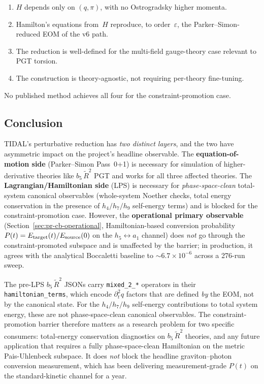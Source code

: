 \begin{enumerate}
  \item[(i)] $H$ depends only on $(q, \pi)$, with no Ostrogradsky higher
        momenta.
  \item[(ii)] Hamilton's equations from~$H$ reproduce, to order~$\varepsilon$,
        the Parker--Simon-reduced EOM of the v6 path.
  \item[(iii)] The reduction is well-defined for the multi-field
        gauge-theory case relevant to PGT torsion.
  \item[(iv)] The construction is theory-agnostic, not requiring per-theory
        fine-tuning.
\end{enumerate}

No published method achieves all four for the constraint-promotion case.

\subsection{Conclusion}
\label{sec:pr-cb-conclusion}

TIDAL's perturbative reduction has \emph{two distinct layers}, and the
two have asymmetric impact on the project's headline observable.  The
\textbf{equation-of-motion side} (Parker--Simon Pass~0+1) is necessary
for simulation of higher-derivative theories like $b_5\,\tilde{R}^2$ PGT
and works for all three affected theories.  The
\textbf{Lagrangian/Hamiltonian side} (LPS) is necessary for
\emph{phase-space-clean} total-system canonical observables (whole-system
Noether checks, total energy conservation in the presence of
$h_4/h_7/h_9$ self-energy terms) and is blocked for the
constraint-promotion case.  However, the
\textbf{operational primary observable}
(Section~\ref{sec:pr-cb-operational}, Hamiltonian-based conversion
probability $P(t) = E_{\rm target}(t)/E_{\rm source}(0)$ on the
$h_5 \leftrightarrow a_1$ channel) does \emph{not} go through the
constraint-promoted subspace and is unaffected by the barrier; in
production, it agrees with the analytical Boccaletti baseline to
$\sim 6.7 \times 10^{-6}$ across a 276-run sweep.

The pre-LPS $b_5\,\tilde{R}^2$ JSONs carry \texttt{mixed\_2\_*}
operators in their \texttt{hamiltonian\_terms}, which encode
$\partial_t^2 q$ factors that are defined \emph{by} the EOM, not by
the canonical state.  For the $h_4/h_7/h_9$ self-energy contributions
to total system energy, these are not phase-space-clean canonical
observables.  The constraint-promotion barrier therefore matters as a
research problem for two specific consumers: total-energy conservation
diagnostics on $b_5\,\tilde{R}^2$ theories, and any future application
that requires a fully phase-space-clean Hamiltonian on the metric
Pais-Uhlenbeck subspace.  It does \emph{not} block the headline
graviton--photon conversion measurement, which has been delivering
measurement-grade $P(t)$ on the standard-kinetic channel for a year.

